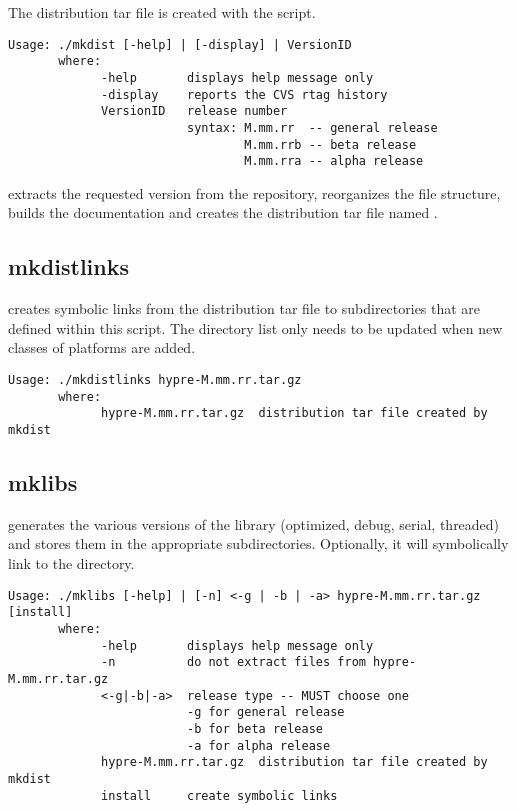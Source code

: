 The distribution tar file is created with the  script.

\begin{verbatim}
Usage: ./mkdist [-help] | [-display] | VersionID
       where:
             -help       displays help message only
             -display    reports the CVS rtag history
             VersionID   release number
                         syntax: M.mm.rr  -- general release
                                 M.mm.rrb -- beta release
                                 M.mm.rra -- alpha release
\end{verbatim}

 extracts the requested version from the repository, reorganizes 
the file structure, builds the documentation and creates the distribution tar 
file named .

\subsection{mkdistlinks}
\label{mkdistlinks}

 creates symbolic links from the \hypre{} distribution tar file
to subdirectories that are defined within this script.  The directory list only
needs to be updated when new classes of platforms are added.

\begin{verbatim}
Usage: ./mkdistlinks hypre-M.mm.rr.tar.gz
       where:
             hypre-M.mm.rr.tar.gz  distribution tar file created by mkdist
\end{verbatim}

\subsection{mklibs}
\label{mklibs}

 generates the various versions of the library (optimized, debug, serial,
threaded) and stores them in the appropriate subdirectories. Optionally, it will 
symbolically link to the  directory.

\begin{verbatim}
Usage: ./mklibs [-help] | [-n] <-g | -b | -a> hypre-M.mm.rr.tar.gz [install]
       where:
             -help       displays help message only
             -n          do not extract files from hypre-M.mm.rr.tar.gz
             <-g|-b|-a>  release type -- MUST choose one
                         -g for general release
                         -b for beta release
                         -a for alpha release
             hypre-M.mm.rr.tar.gz  distribution tar file created by mkdist
             install     create symbolic links
\end{verbatim}

